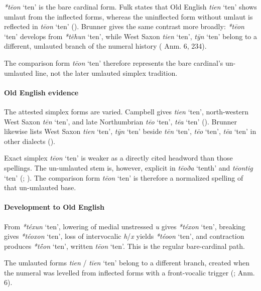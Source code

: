 \documentclass[
  british,
  a4paper,
]{article}
\providecommand{\Recon}[1]{\emph{*#1}}
\begin{document}
\Recon{tēon} `ten' is the bare cardinal form. Fulk states that Old
English \emph{tien} `ten' shows umlaut from the inflected forms, whereas
the uninflected form without umlaut is reflected in \emph{tēon} `ten'
(). Brunner gives the same
contrast more broadly: \Recon{tēon} `ten' develops from \Recon{tëhun}
`ten', while West Saxon \emph{tien} `ten', \emph{tȳn} `ten' belong to a
different, umlauted branch of the numeral history
( Anm.
6, 234).

The comparison form \emph{tēon} `ten' therefore represents the bare
cardinal's un-umlauted line, not the later umlauted simplex tradition.

\paragraph{Old English evidence}\label{old-english-evidence-79}

The attested simplex forms are varied. Campbell gives \emph{tien} `ten',
north-western West Saxon \emph{tēn} `ten', and late Northumbrian
\emph{tēo} `ten', \emph{tēa} `ten' (). Brunner likewise lists West Saxon \emph{tien} `ten',
\emph{tȳn} `ten' beside \emph{tēn} `ten', \emph{tēo} `ten', \emph{tēa}
`ten' in other dialects ().

Exact simplex \emph{tēon} `ten' is weaker as a directly cited headword
than those spellings. The un-umlauted stem is, however, explicit in
\emph{tēoða} `tenth' and \emph{tēontig} `ten'
(;
). The comparison form
\emph{tēon} `ten' is therefore a normalized spelling of that un-umlauted
base.

\paragraph{Development to Old
English}\label{development-to-old-english-79}

From \Recon{téxun} `ten', lowering of medial unstressed \emph{u} gives
\Recon{téxon} `ten', breaking gives \Recon{téoxon} `ten', loss of
intervocalic \emph{h}/\emph{x} yields \Recon{téoon} `ten', and
contraction produces \Recon{tḗon} `ten', written \emph{tēon} `ten'. This
is the regular bare-cardinal path.

The umlauted forms \emph{tien} / \emph{tīen} `ten' belong to a different
branch, created when the numeral was levelled from inflected forms with
a front-vocalic trigger (;
 Anm. 6).
\end{document}
